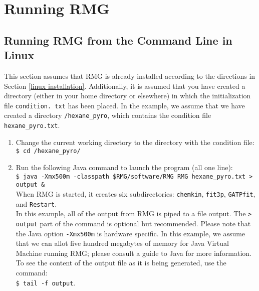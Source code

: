 \documentclass[12pt,letterpaper]{article}
\begin{document}
\section{Running RMG}
\subsection{Running RMG from the Command Line in Linux}\label{running in linux}

This section assumes that RMG is already installed according to the directions
in Section \ref{linux installation}. Additionally, it is assumed that you have created a
directory (either in your home directory or elsewhere) in which the initialization file \texttt{condition.
txt} has been placed. In the example, we assume that we have created a
directory \texttt{/hexane\_pyro}, which contains the condition file \texttt{hexane\_pyro.txt}.

\begin{enumerate}
\item Change the current working directory to the directory with the condition file:\\

\texttt{\$ cd /hexane\_pyro/}\\

\item Run the following Java command to launch the program (all one line):\\

\texttt{\$ java -Xmx500m -classpath \$RMG/software/RMG RMG hexane\_pyro.txt
> output \&} \\

When RMG is started, it creates six subdirectories: \texttt{chemkin}, \texttt{fit3p},
\texttt{GATPfit}, and \texttt{Restart}.\\

In this example, all of the output from RMG is piped to a file output. The
\texttt{> output} part of the command is optional but recommended. Please note
that the Java option \texttt{-Xmx500m} is hardware specific. In this example, we
assume that we can allot five hundred megabytes of memory for Java Virtual
Machine running RMG; please consult a guide to Java for more information.
To see the content of the output file as it is being generated, use the command:\\ \texttt{\$ tail -f output}.

\end{enumerate}
\end{document}
